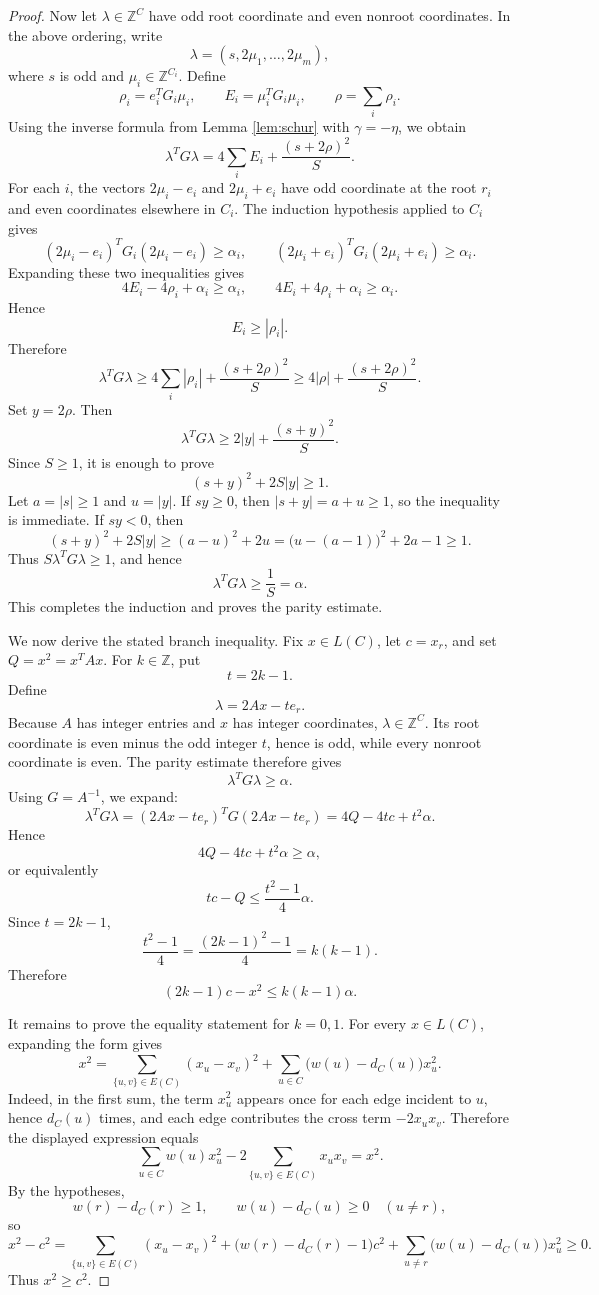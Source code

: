 \documentclass[12pt]{article}
\newcommand{\Z}{\mathbb{Z}}
\begin{document}
\begin{proof}
Now let \(\lambda\in\Z^C\) have odd root coordinate and even nonroot coordinates. In the above ordering, write
\[
\lambda=(s,2\mu_1,\dots,2\mu_m),
\]
where \(s\) is odd and \(\mu_i\in\Z^{C_i}\). Define
\[
\rho_i=e_i^TG_i\mu_i,
\qquad
E_i=\mu_i^TG_i\mu_i,
\qquad
\rho=\sum_i\rho_i.
\]
Using the inverse formula from Lemma \ref{lem:schur} with \(\gamma=-\eta\), we obtain
\[
\lambda^TG\lambda
=
4\sum_i E_i+\frac{(s+2\rho)^2}{S}.
\]
For each \(i\), the vectors \(2\mu_i-e_i\) and \(2\mu_i+e_i\) have odd coordinate at the root \(r_i\) and even coordinates elsewhere in \(C_i\). The induction hypothesis applied to \(C_i\) gives
\[
(2\mu_i-e_i)^TG_i(2\mu_i-e_i)\ge \alpha_i,
\qquad
(2\mu_i+e_i)^TG_i(2\mu_i+e_i)\ge \alpha_i.
\]
Expanding these two inequalities gives
\[
4E_i-4\rho_i+\alpha_i\ge \alpha_i,
\qquad
4E_i+4\rho_i+\alpha_i\ge \alpha_i.
\]
Hence
\[
E_i\ge |\rho_i|.
\]
Therefore
\[
\lambda^TG\lambda
\ge
4\sum_i|\rho_i|+\frac{(s+2\rho)^2}{S}
\ge
4|\rho|+\frac{(s+2\rho)^2}{S}.
\]
Set \(y=2\rho\). Then
\[
\lambda^TG\lambda
\ge
2|y|+\frac{(s+y)^2}{S}.
\]
Since \(S\ge 1\), it is enough to prove
\[
(s+y)^2+2S|y|\ge 1.
\]
Let \(a=|s|\ge 1\) and \(u=|y|\). If \(sy\ge 0\), then \(|s+y|=a+u\ge 1\), so the inequality is immediate. If \(sy<0\), then
\[
(s+y)^2+2S|y|
\ge
(a-u)^2+2u
=
\bigl(u-(a-1)\bigr)^2+2a-1
\ge 1.
\]
Thus \(S\lambda^TG\lambda\ge 1\), and hence
\[
\lambda^TG\lambda\ge \frac{1}{S}=\alpha.
\]
This completes the induction and proves the parity estimate.

We now derive the stated branch inequality. Fix \(x\in L(C)\), let \(c=x_r\), and set \(Q=x^2=x^TAx\). For \(k\in\Z\), put
\[
t=2k-1.
\]
Define
\[
\lambda=2Ax-te_r.
\]
Because \(A\) has integer entries and \(x\) has integer coordinates, \(\lambda\in\Z^C\). Its root coordinate is even minus the odd integer \(t\), hence is odd, while every nonroot coordinate is even. The parity estimate therefore gives
\[
\lambda^TG\lambda\ge \alpha.
\]
Using \(G=A^{-1}\), we expand:
\[
\lambda^TG\lambda
=
(2Ax-te_r)^TG(2Ax-te_r)
=
4Q-4tc+t^2\alpha.
\]
Hence
\[
4Q-4tc+t^2\alpha\ge \alpha,
\]
or equivalently
\[
tc-Q\le \frac{t^2-1}{4}\alpha.
\]
Since \(t=2k-1\),
\[
\frac{t^2-1}{4}
=
\frac{(2k-1)^2-1}{4}
=
k(k-1).
\]
Therefore
\[
(2k-1)c-x^2\le k(k-1)\alpha.
\]

It remains to prove the equality statement for \(k=0,1\). For every \(x\in L(C)\), expanding the form gives
\[
x^2
=
\sum_{\{u,v\}\in E(C)}(x_u-x_v)^2
+
\sum_{u\in C}\bigl(w(u)-d_C(u)\bigr)x_u^2.
\]
Indeed, in the first sum, the term \(x_u^2\) appears once for each edge incident to \(u\), hence \(d_C(u)\) times, and each edge contributes the cross term \(-2x_ux_v\). Therefore the displayed expression equals
\[
\sum_{u\in C}w(u)x_u^2-2\sum_{\{u,v\}\in E(C)}x_ux_v=x^2.
\]
By the hypotheses,
\[
w(r)-d_C(r)\ge 1,
\qquad
w(u)-d_C(u)\ge 0\quad(u\ne r),
\]
so
\[
x^2-c^2
=
\sum_{\{u,v\}\in E(C)}(x_u-x_v)^2
+
\bigl(w(r)-d_C(r)-1\bigr)c^2
+
\sum_{u\ne r}\bigl(w(u)-d_C(u)\bigr)x_u^2
\ge 0.
\]
Thus \(x^2\ge c^2\).


\end{proof}
\end{document}
